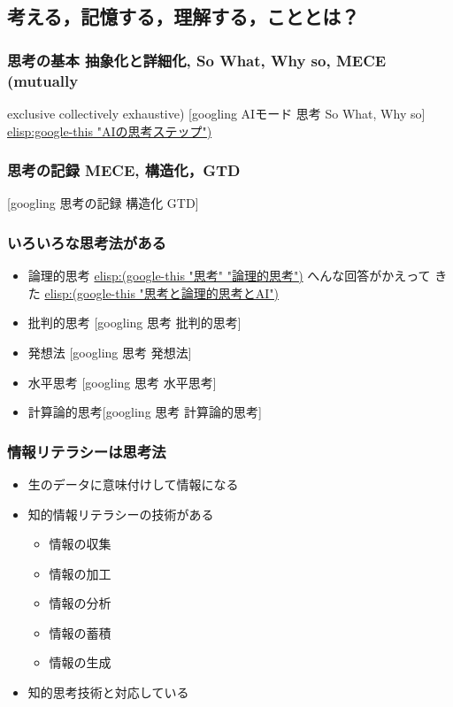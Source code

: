 \documentclass[dvipdfmx,11pat]{jarticle}
\begin{document}
\subsection{考える，記憶する，理解する，こととは？}
\label{sec:orgc48bef1}
\subsubsection{思考の基本 抽象化と詳細化, So What, Why so, MECE (mutually}
\label{sec:org522b1ed}
exclusive collectively exhaustive)
{[}googling AIモード 思考 So What, Why so]
\url{elisp:google-this "AIの思考ステップ")}
\subsubsection{思考の記録 MECE, 構造化，GTD}
\label{sec:org8cb7b2c}
{[}googling 思考の記録 構造化 GTD]
\subsubsection{いろいろな思考法がある}
\label{sec:orgf9b364d}
\begin{itemize}
\item 論理的思考  \url{elisp:(google-this "思考" "論理的思考")} へんな回答がかえって
きた
\url{elisp:(google-this "思考と論理的思考とAI")}

\item 批判的思考 [googling 思考 批判的思考]
\item 発想法 [googling 思考 発想法]
\item 水平思考 [googling 思考 水平思考]
\item 計算論的思考[googling 思考 計算論的思考]
\end{itemize}
\subsubsection{情報リテラシーは思考法}
\label{sec:org4e27797}
\begin{itemize}
\item 生のデータに意味付けして情報になる
\item 知的情報リテラシーの技術がある
\begin{itemize}
\item 情報の収集
\item 情報の加工
\item 情報の分析
\item 情報の蓄積
\item 情報の生成
\end{itemize}
\item 知的思考技術と対応している
\end{itemize}
\end{document}
